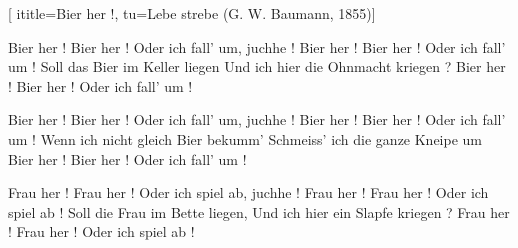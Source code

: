 [
  ititle={Bier her !},
  tu={Lebe strebe (G. W. Baumann, 1855)}]
  
\beginverse
Bier her ! Bier her !
Oder ich fall' um, juchhe !
Bier her ! Bier her !
Oder ich fall' um !
Soll das Bier im Keller liegen
Und ich hier die Ohnmacht kriegen ?
Bier her ! Bier her !
Oder ich fall' um !
\endverse

\beginverse
Bier her ! Bier her !
Oder ich fall' um, juchhe !
Bier her ! Bier her !
Oder ich fall' um !
Wenn ich nicht gleich Bier bekumm'
Schmeiss' ich die ganze Kneipe um
Bier her ! Bier her !
Oder ich fall' um !
\endverse

\beginverse
Frau her ! Frau her !
Oder ich spiel ab, juchhe !
Frau her ! Frau her !
Oder ich spiel ab !
Soll die Frau im Bette liegen,
Und ich hier ein Slapfe kriegen ?
Frau her ! Frau her !
Oder ich spiel ab !
\endverse

\endsong
